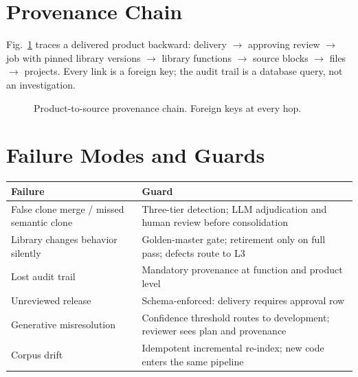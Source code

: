 \documentclass[conference]{IEEEtran}
\begin{document}
\section{Provenance Chain}
Fig.~\ref{fig:prov} traces a delivered product backward: delivery $\rightarrow$ approving review $\rightarrow$ job with pinned library versions $\rightarrow$ library functions $\rightarrow$ source blocks $\rightarrow$ files $\rightarrow$ projects. Every link is a foreign key; the audit trail is a database query, not an investigation.

\begin{figure}[t]
\centering
{}
\caption{Product-to-source provenance chain. Foreign keys at every hop.}
\label{fig:prov}
\end{figure}

\section{Failure Modes and Guards}
\begin{table}[h]
\scriptsize
\centering
\begin{tabular}{p{3.6cm} p{3.9cm}}
\toprule
\textbf{Failure} & \textbf{Guard} \\
\midrule
False clone merge / missed semantic clone & Three-tier detection; LLM adjudication and human review before consolidation \\
Library changes behavior silently & Golden-master gate; retirement only on full pass; defects route to L3 \\
Lost audit trail & Mandatory provenance at function and product level \\
Unreviewed release & Schema-enforced: delivery requires approval row \\
Generative misresolution & Confidence threshold routes to development; reviewer sees plan and provenance \\
Corpus drift & Idempotent incremental re-index; new code enters the same pipeline \\
\bottomrule
\end{tabular}
\end{table}
\end{document}
